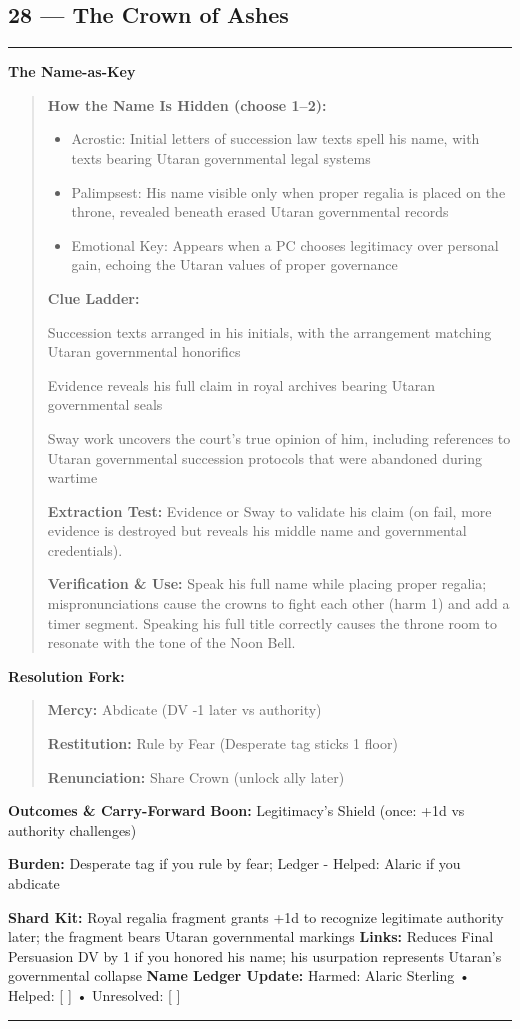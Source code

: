 \documentclass[18pt, letterpaper, twoside]{article}
\newenvironment{floorbox}[1]{%
    \begin{center}
    \begin{minipage}{0.95\textwidth}
    \subsection*{#1}
    \vspace{-0.5em}
    \rule{\textwidth}{0.5pt}
    \vspace{0.5em}
}{%
    \vspace{0.5em}
    \rule{\textwidth}{0.5pt}
    \end{minipage}
    \end{center}
}
\newenvironment{gmnote}[1]{%
    \vspace{0.5em}
    \noindent\textbf{#1}
    \begin{quote}
}{%
    \end{quote}
    \vspace{0.5em}
}
\newenvironment{resolutionbox}{%
    \vspace{0.5em}
    \noindent\textbf{Resolution Fork:}
    \begin{quote}
}{%
    \end{quote}
    \vspace{0.5em}
}
\newcommand{\boon}[1]{\noindent\textbf{Boon:} #1\par}
\newcommand{\burden}[1]{\noindent\textbf{Burden:} #1\par}
\begin{document}
\begin{floorbox}{28 --- The Crown of Ashes}
\begin{gmnote}{The Name-as-Key}
\textbf{How the Name Is Hidden (choose 1--2):}
\begin{itemize}[leftmargin=*]
    \item Acrostic: Initial letters of succession law texts spell his name, with texts bearing Utaran governmental legal systems
    \item Palimpsest: His name visible only when proper regalia is placed on the throne, revealed beneath erased Utaran governmental records
    \item Emotional Key: Appears when a PC chooses legitimacy over personal gain, echoing the Utaran values of proper governance
\end{itemize}

\textbf{Clue Ladder:}
\begin{description}[leftmargin=*, style=unboxed]
    \item[Gentle Nudge:] Succession texts arranged in his initials, with the arrangement matching Utaran governmental honorifics
    \item[Actionable Lead:] Evidence reveals his full claim in royal archives bearing Utaran governmental seals
    \item[Aha! Proof:] Sway work uncovers the court's true opinion of him, including references to Utaran governmental succession protocols that were abandoned during wartime
\end{description}

\textbf{Extraction Test:} Evidence or Sway to validate his claim (on fail, more evidence is destroyed but reveals his middle name and governmental credentials).

\textbf{Verification \& Use:} Speak his full name while placing proper regalia; mispronunciations cause the crowns to fight each other (harm 1) and add a timer segment. Speaking his full title correctly causes the throne room to resonate with the tone of the Noon Bell.
\end{gmnote}

\begin{resolutionbox}
\textbf{Mercy:} Abdicate (DV -1 later vs authority)

\textbf{Restitution:} Rule by Fear (Desperate tag sticks 1 floor)

\textbf{Renunciation:} Share Crown (unlock ally later)
\end{resolutionbox}

\textbf{Outcomes \& Carry-Forward}
\boon{Legitimacy's Shield (once: +1d vs authority challenges)}
\burden{Desperate tag if you rule by fear; Ledger - Helped: Alaric if you abdicate}
\textbf{Shard Kit:} Royal regalia fragment grants +1d to recognize legitimate authority later; the fragment bears Utaran governmental markings
\textbf{Links:} Reduces Final Persuasion DV by 1 if you honored his name; his usurpation represents Utaran's governmental collapse
\textbf{Name Ledger Update:} Harmed: Alaric Sterling • Helped: [ ] • Unresolved: [ ]


\end{floorbox}
\end{document}
